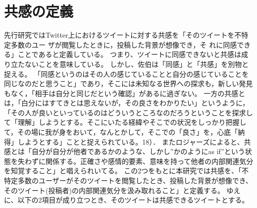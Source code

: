 \documentclass[dvipdfmx]{issj}
\begin{document}
\section{共感の定義}  %

先行研究ではTwitter上におけるツイートに対する共感を「そのツイートを不特定多数のユー ザが閲覧したときに，投稿した背景が想像でき，そ れに同感できる」ことであると定義している。
つまり、ツイートに同感できないと共感は成り立たないことを意味している。
しかし、佐伯は「同感」と「共感」を別物と捉える。
「同感というのはその人の感じていることと自分の感じていることを同じなのだと思うこと」であり，そこには未知なる世界への探求も，新しい発見もなく，「相手は自分と同じだという確認」があるに過ぎない。
一方の共感とは，「白分にはすてきとは思えないが，その良さをわかりたい」というように，「その人が良いといっているのはどういうところなのだろうということを探求して「理解」しようとする。そこにいたる経緯やそこでの状況をしっかり把握して，その場に我が身をおいて，なんとかして，そこでの「良さ」を，心底「納得」しようとする」ことと捉えられている。18）．
またロジャーズによると、共感とは「自分が自分が他者であるかのような、しかし”かのようにas if”という状態を失わずに関係する。正確さや感情的要素、意味を持って他者の内部関連気分を知覚すること」と唱えられいてる。
この2つをもとに本研究では共感を、「不特定多数のユーザーがそのツイートを閲覧したとき、投稿した背景が想像でき、そのツイート(投稿者)の内部関連気分を汲み取れること」と定義する。
ゆえに、以下の2項目が成り立つとき、そのツイートは共感できるツイートとする。











\end{document}
